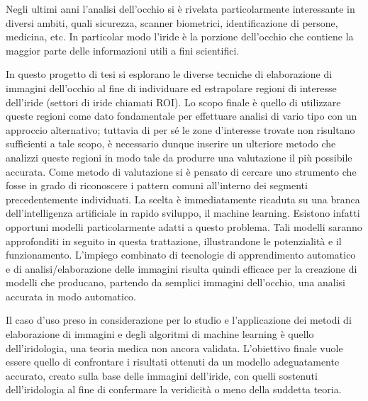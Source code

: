 Negli ultimi anni l’analisi dell’occhio si è rivelata particolarmente interessante in diversi ambiti, quali sicurezza, scanner biometrici, identificazione di persone, medicina, etc. In particolar modo l’iride è la porzione dell’occhio che contiene la maggior parte delle informazioni utili a fini scientifici. 

In questo progetto di tesi si esplorano le diverse tecniche di elaborazione di immagini dell’occhio al fine di individuare ed estrapolare regioni di interesse dell’iride (settori di iride chiamati ROI). Lo scopo finale è quello di utilizzare queste regioni come dato fondamentale per effettuare analisi di vario tipo con un approccio alternativo; tuttavia di per sé le zone d’interesse trovate non risultano sufficienti a tale scopo, è necessario dunque inserire un ulteriore metodo che analizzi queste regioni in modo tale da produrre una valutazione il più possibile accurata. Come metodo di valutazione si è pensato di cercare uno strumento che fosse in grado di riconoscere i pattern comuni all’interno dei segmenti precedentemente individuati. La scelta è immediatamente ricaduta su una branca dell’intelligenza artificiale in rapido sviluppo, il machine learning. Esistono infatti opportuni modelli particolarmente adatti a questo problema. Tali modelli saranno approfonditi in seguito in questa trattazione, illustrandone le potenzialità e il funzionamento. L’impiego combinato di tecnologie di apprendimento automatico e di analisi/elaborazione delle immagini risulta quindi efficace per la creazione di modelli che producano, partendo da semplici immagini dell’occhio, una analisi accurata in modo automatico. 

Il caso d’uso preso in considerazione per lo studio e l’applicazione dei metodi di elaborazione di immagini e degli algoritmi di machine learning è quello dell’iridologia, una teoria medica non ancora validata. L’obiettivo finale vuole essere quello di confrontare i risultati ottenuti da un modello adeguatamente accurato, creato sulla base delle immagini dell’iride, con quelli sostenuti dell'iridologia al fine di confermare la veridicità o meno della suddetta teoria. 

 
